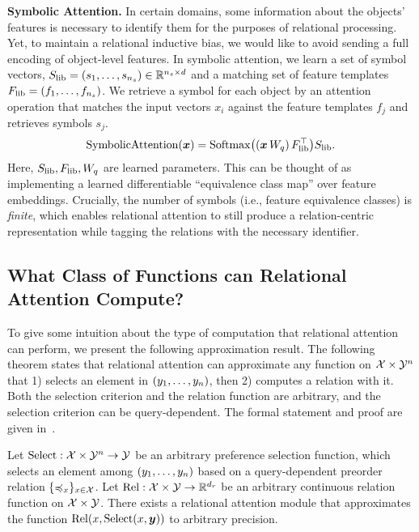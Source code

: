 \textbf{Symbolic Attention.} In certain domains, some information about the objects' features is necessary to identify them for the purposes of relational processing. Yet, to maintain a relational inductive bias, we would like to avoid sending a full encoding of object-level features. In symbolic attention, we learn a set of symbol vectors, $S_\mathrm{lib} = (s_1, \ldots, s_{n_s}) \in \mathbb{R}^{n_s \times d}$ and a matching set of feature templates $F_\mathrm{lib} = (f_1, \ldots, f_{n_s})$. We retrieve a symbol for each object by an attention operation that matches the input vectors $x_i$ against the feature templates $f_j$ and retrieves symbols $s_j$.
\begin{equation}
  \mathrm{SymbolicAttention}(\bm{x}) = \mathrm{Softmax}\big((\bm{x} \, W_q)\, F_\mathrm{lib}^\top\big) S_\mathrm{lib}.
\end{equation}
Here, $S_\mathrm{lib}, F_\mathrm{lib}, W_q$ are learned parameters. This can be thought of as implementing a learned differentiable ``equivalence class map'' over feature embeddings. Crucially, the number of symbols (i.e., feature equivalence classes) is \textit{finite}, which enables relational attention to still produce a relation-centric representation while tagging the relations with the necessary identifier.


\subsection{What Class of Functions can Relational Attention Compute?}\label{ssec:approx}
To give some intuition about the type of computation that relational attention can perform, we present the following approximation result. The following theorem states that relational attention can approximate any function on ${\mathcal{X}} \times {\mathcal{Y}}^n$ that 1) selects an element in $(y_1, \ldots, y_n)$, then 2) computes a relation with it. Both the selection criterion and the relation function are arbitrary, and the selection criterion can be query-dependent. The formal statement and proof are given in~.
\begin{theorem}[Informal]\label{theorem:func_class}
  Let $\mathrm{Select}: {\mathcal{X}} \times {\mathcal{Y}}^n \to {\mathcal{Y}}$ be an arbitrary preference selection function, which selects an element among $(y_1, \ldots, y_n)$ based on a query-dependent preorder relation $\{\preccurlyeq_x\}_{x \in {\mathcal{X}}}$. Let $\mathrm{Rel}: {\mathcal{X}} \times {\mathcal{Y}} \to \mathbb{R}^{d_r}$ be an arbitrary continuous relation function on ${\mathcal{X}} \times {\mathcal{Y}}$. There exists a relational attention module that approximates the function $\mathrm{Rel}(x, \mathrm{Select}(x, \bm{y}))$ to arbitrary precision.
\end{theorem}
